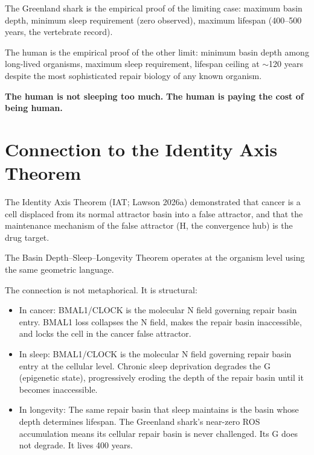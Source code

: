 \documentclass[12pt, a4paper]{article}
\begin{document}
The Greenland shark is the empirical proof of the limiting
case: maximum basin depth, minimum sleep requirement
(zero observed), maximum lifespan (400--500 years, the
vertebrate record).

The human is the empirical proof of the other limit:
minimum basin depth among long-lived organisms, maximum
sleep requirement, lifespan ceiling at $\sim$120 years
despite the most sophisticated repair biology of any
known organism.

\textbf{The human is not sleeping too much.}
\textbf{The human is paying the cost of being human.}

\section{Connection to the Identity Axis Theorem}
\label{sec:iat}

The Identity Axis Theorem (IAT; Lawson 2026a) demonstrated
that cancer is a cell displaced from its normal attractor
basin into a false attractor, and that the maintenance
mechanism of the false attractor (H, the convergence hub)
is the drug target.

The Basin Depth--Sleep--Longevity Theorem operates at the
organism level using the same geometric language.

The connection is not metaphorical. It is structural:

\begin{itemize}
    \item In cancer: BMAL1/CLOCK is the molecular N field
          governing repair basin entry. BMAL1 loss collapses
          the N field, makes the repair basin inaccessible,
          and locks the cell in the cancer false attractor.
    \item In sleep: BMAL1/CLOCK is the molecular N field
          governing repair basin entry at the cellular level.
          Chronic sleep deprivation degrades the G (epigenetic
          state), progressively eroding the depth of the
          repair basin until it becomes inaccessible.
    \item In longevity: The same repair basin that sleep
          maintains is the basin whose depth determines
          lifespan. The Greenland shark's near-zero ROS
          accumulation means its cellular repair basin
          is never challenged. Its G does not degrade. It
          lives 400 years.
\end{itemize}
\end{document}
